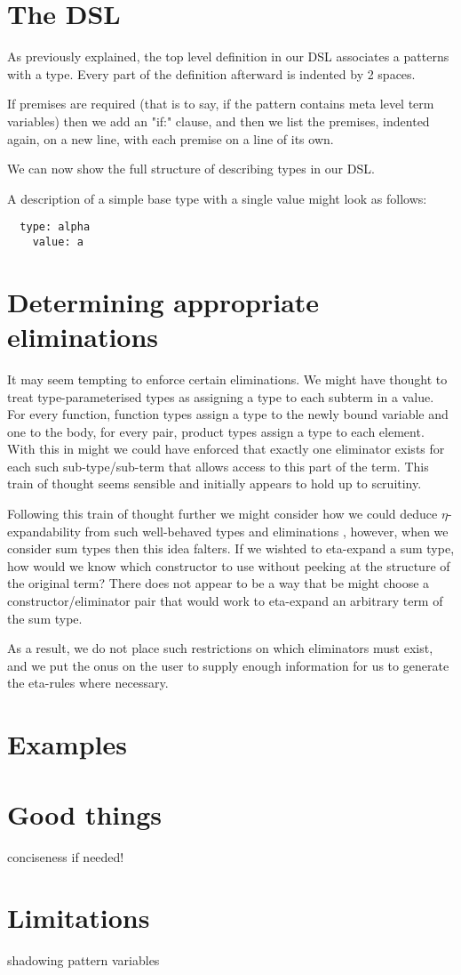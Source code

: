 \section{The DSL}

As previously explained, the top level definition in our DSL
associates a patterns with a type. Every part of the definition
afterward is indented by 2 spaces.

If premises are required (that is to say, if the pattern contains meta
level term variables) then we add an "if:" clause, and then we list
the premises, indented again, on a new line, with each premise on a
line of its own.

We can now show the full structure of describing types in our DSL.

A description of a simple base type with a single value might look as
follows:

\begin{BVerbatim}
  type: alpha
    value: a
\end{BVerbatim}


\section{Determining appropriate eliminations}
\label{appr-elim}

It may seem tempting to enforce certain eliminations. We might have
thought to treat type-parameterised types as assigning a type to each
subterm in a value. For every function, function types assign a type to
the newly bound variable and one to the body, for every pair, product
types assign a type to each element. With this in might we could have
enforced that exactly one eliminator exists for each such
sub-type/sub-term that allows access to this part of the term. This
train of thought seems sensible and initially appears to hold up to
scruitiny.

Following this train of thought further we might consider how we could
deduce $\eta$-expandability from such well-behaved types and
eliminations , however, when we consider sum types then this idea
falters. If we wishted to eta-expand a sum type, how would we know
which constructor to use without peeking at the structure of the
original term? There does not appear to be a way that be might choose
a constructor/eliminator pair that would work to eta-expand an
arbitrary term of the sum type.

As a result, we do not place such restrictions on which eliminators
must exist, and we put the onus on the user to supply enough
information for us to generate the eta-rules where necessary.

\section{Examples}

\section{Good things}

conciseness if needed!

\section{Limitations}

shadowing pattern variables
